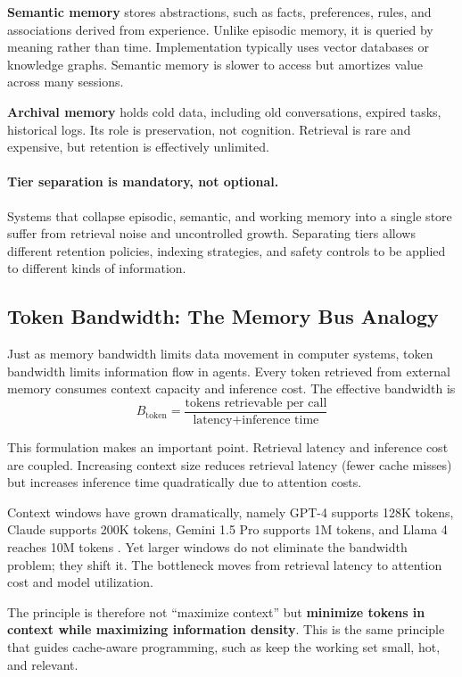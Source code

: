 \textbf{Semantic memory} stores abstractions, such as facts, preferences, rules, and associations derived from experience. Unlike episodic memory, it is queried by meaning rather than time. Implementation typically uses vector databases or knowledge graphs. Semantic memory is slower to access but amortizes value across many sessions.

\textbf{Archival memory} holds cold data, including old conversations, expired tasks, historical logs. Its role is preservation, not cognition. Retrieval is rare and expensive, but retention is effectively unlimited.

\paragraph{Tier separation is mandatory, not optional.}
Systems that collapse episodic, semantic, and working memory into a single store suffer from retrieval noise and uncontrolled growth. Separating tiers allows different retention policies, indexing strategies, and safety controls to be applied to different kinds of information.

\subsection{Token Bandwidth: The Memory Bus Analogy}

Just as memory bandwidth limits data movement in computer systems, token bandwidth limits information flow in agents. Every token retrieved from external memory consumes context capacity and inference cost. The effective bandwidth is
\[
B_{\text{token}} = \frac{\text{tokens retrievable per call}}{\text{latency} + \text{inference time}}
\]

This formulation makes an important point. Retrieval latency and inference cost are coupled. Increasing context size reduces retrieval latency (fewer cache misses) but increases inference time quadratically due to attention costs.

Context windows have grown dramatically, namely GPT-4 supports 128K tokens, Claude supports 200K tokens, Gemini 1.5 Pro supports 1M tokens, and Llama 4 reaches 10M tokens \cite{anthropic2025claude}. Yet larger windows do not eliminate the bandwidth problem; they shift it. The bottleneck moves from retrieval latency to attention cost and model utilization.

The principle is therefore not ``maximize context'' but \textbf{minimize tokens in context while maximizing information density}. This is the same principle that guides cache-aware programming, such as keep the working set small, hot, and relevant.

